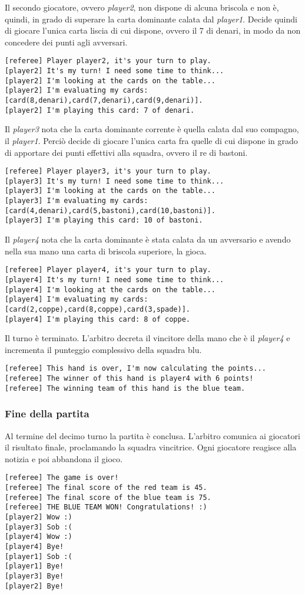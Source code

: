 \documentclass[a4paper,12pt]{article}
\begin{document}
Il secondo giocatore, ovvero \emph{player2}, non dispone di alcuna briscola e non è, quindi, in grado di superare la carta dominante calata dal \emph{player1}. Decide quindi di giocare l'unica carta liscia di cui dispone, ovvero il 7 di denari, in modo da non concedere dei punti agli avversari.
\begin{Verbatim}
[referee] Player player2, it's your turn to play.
[player2] It's my turn! I need some time to think...
[player2] I'm looking at the cards on the table...
[player2] I'm evaluating my cards: [card(8,denari),card(7,denari),card(9,denari)].
[player2] I'm playing this card: 7 of denari.
\end{Verbatim}
Il \emph{player3} nota che la carta dominante corrente è quella calata dal suo compagno, il \emph{player1}. Perciò decide di giocare l'unica carta fra quelle di cui dispone in grado di apportare dei punti effettivi alla squadra, ovvero il re di bastoni.
\begin{Verbatim}
[referee] Player player3, it's your turn to play.
[player3] It's my turn! I need some time to think...
[player3] I'm looking at the cards on the table...
[player3] I'm evaluating my cards: [card(4,denari),card(5,bastoni),card(10,bastoni)].
[player3] I'm playing this card: 10 of bastoni.
\end{Verbatim}
Il \emph{player4} nota che la carta dominante è stata calata da un avversario e avendo nella sua mano una carta di briscola superiore, la gioca.
\begin{Verbatim}
[referee] Player player4, it's your turn to play.
[player4] It's my turn! I need some time to think...
[player4] I'm looking at the cards on the table...
[player4] I'm evaluating my cards: [card(2,coppe),card(8,coppe),card(3,spade)].
[player4] I'm playing this card: 8 of coppe.
\end{Verbatim}
Il turno è terminato. L'arbitro decreta il vincitore della mano che è il \emph{player4} e incrementa il punteggio complessivo della squadra blu.
\begin{Verbatim}
[referee] This hand is over, I'm now calculating the points...
[referee] The winner of this hand is player4 with 6 points!
[referee] The winning team of this hand is the blue team.
\end{Verbatim}

\subsubsection{Fine della partita}
Al termine del decimo turno la partita è conclusa. L'arbitro comunica ai giocatori il risultato finale, proclamando la squadra vincitrice. Ogni giocatore reagisce alla notizia e poi abbandona il gioco.
\begin{Verbatim}
[referee] The game is over!
[referee] The final score of the red team is 45.
[referee] The final score of the blue team is 75.
[referee] THE BLUE TEAM WON! Congratulations! :)
[player2] Wow :)
[player3] Sob :(
[player4] Wow :)
[player4] Bye!
[player1] Sob :(
[player1] Bye!
[player3] Bye!
[player2] Bye!
\end{Verbatim}
\end{document}

